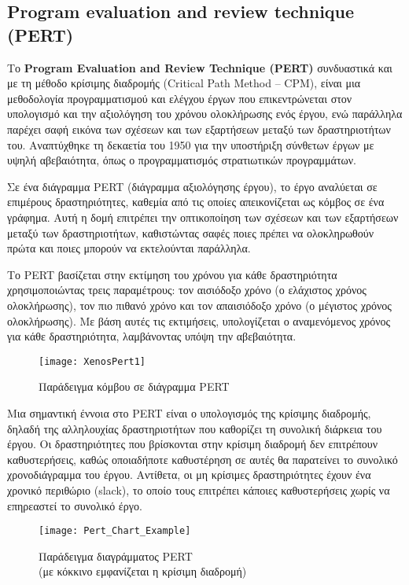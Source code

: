         \subsection{Program evaluation and review technique (PERT)}
            Το \textbf{Program Evaluation and Review Technique (PERT)} συνδυαστικά και με τη μέθοδο κρίσιμης διαδρομής (Critical Path Method -- CPM), είναι μια μεθοδολογία προγραμματισμού και ελέγχου έργων που επικεντρώνεται στον υπολογισμό και την αξιολόγηση του χρόνου ολοκλήρωσης ενός έργου, ενώ παράλληλα παρέχει σαφή εικόνα των σχέσεων και των εξαρτήσεων μεταξύ των δραστηριοτήτων του. Αναπτύχθηκε τη δεκαετία του 1950 για την υποστήριξη σύνθετων έργων με υψηλή αβεβαιότητα, όπως ο προγραμματισμός στρατιωτικών προγραμμάτων.

            Σε ένα διάγραμμα PERT (διάγραμμα αξιολόγησης έργου), το έργο αναλύεται σε επιμέρους δραστηριότητες, καθεμία από τις οποίες απεικονίζεται ως κόμβος σε ένα γράφημα. Αυτή η δομή επιτρέπει την οπτικοποίηση των σχέσεων και των εξαρτήσεων μεταξύ των δραστηριοτήτων, καθιστώντας σαφές ποιες πρέπει να ολοκληρωθούν πρώτα και ποιες μπορούν να εκτελούνται παράλληλα.

            Το PERT βασίζεται στην εκτίμηση του χρόνου για κάθε δραστηριότητα χρησιμοποιώντας τρεις παραμέτρους: τον αισιόδοξο χρόνο (ο ελάχιστος χρόνος ολοκλήρωσης), τον πιο πιθανό χρόνο και τον απαισιόδοξο χρόνο (ο μέγιστος χρόνος ολοκλήρωσης). Με βάση αυτές τις εκτιμήσεις, υπολογίζεται ο αναμενόμενος χρόνος για κάθε δραστηριότητα, λαμβάνοντας υπόψη την αβεβαιότητα.

            \begin{figure}[h!] \noindent \centering
                \texttt{[image: XenosPert1]}
                \caption{Παράδειγμα κόμβου σε διάγραμμα PERT \cite{Xenos}}
            \end{figure}

            Μια σημαντική έννοια στο PERT είναι ο υπολογισμός της κρίσιμης διαδρομής, δηλαδή της αλληλουχίας δραστηριοτήτων που καθορίζει τη συνολική διάρκεια του έργου. Οι δραστηριότητες που βρίσκονται στην κρίσιμη διαδρομή δεν επιτρέπουν καθυστερήσεις, καθώς οποιαδήποτε καθυστέρηση σε αυτές θα παρατείνει το συνολικό χρονοδιάγραμμα του έργου. Αντίθετα, οι μη κρίσιμες δραστηριότητες έχουν ένα χρονικό περιθώριο (slack), το οποίο τους επιτρέπει κάποιες καθυστερήσεις χωρίς να επηρεαστεί το συνολικό έργο.

            \begin{figure}[h!] \noindent \centering
                \texttt{[image: Pert\_Chart\_Example]}
                \caption{\centering Παράδειγμα διαγράμματος PERT \\ (με κόκκινο εμφανίζεται η κρίσιμη διαδρομή)}
            \end{figure}

